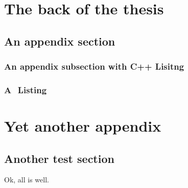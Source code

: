 \documentclass[a4paper,11pt]{MScThesis}
\begin{document}
\cleardoublepage

		
		
		
		




%
    


\appendix

    \chapter{The back of the thesis}

    \section{An appendix section}

    \subsection{An appendix subsection with C++ Lisitng}

    \lstset{language=C++}
    

    \subsection{A \matlab $ $ Listing}

    \lstset{language=matlab}
    

    \chapter{Yet another appendix}

    \section{Another test section}

    Ok, all is well.

    \printindex
    \cleardoublepage
\end{document}
